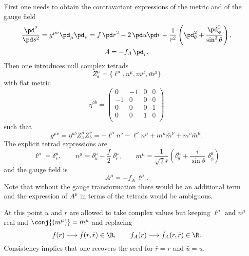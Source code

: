 First one needs to obtain the contravariant expressions of the metric and of the gauge field
\begin{subequations}
\begin{gather}
	\frac{\pd^2}{\pd s^2} = g^{\mu\nu} \pd_\mu \pd_\nu
		= f\, \pd r^2 - 2\, \pd u \pd r + \frac{1}{r^2} \left( \pd_\theta^2 + \frac{\pd_\phi^2}{\sin^2 \theta} \right), \\
	A = - f_A\, \pd_r.
\end{gather}
\end{subequations}
Then one introduces null complex tetrads
\begin{equation}
	Z_a^\mu = \{ \ell^\mu, n^\mu, m^\mu, \bar m^\mu \}
\end{equation} 
with flat metric
\begin{equation}
	\eta^{ab} =
		\begin{pmatrix}
			0 & -1 & 0 & 0 \\
			-1 & 0 & 0 & 0 \\
			0 &  0 & 0 & 1 \\
			0 &  0 & 1 & 0 \\
		\end{pmatrix}
\end{equation} 
such that
\begin{equation}
	g^{\mu\nu} = \eta^{ab} Z^\mu_a Z^\nu_b
		= - \ell^\mu n^\nu - \ell^\nu n^\mu + m^\mu \bar m^\nu + m^\nu \bar m^\mu.
\end{equation} 
The explicit tetrad expressions are
\begin{equation}
	\label{algo:eq:static:tetrads}
	\ell^\mu = \delta_r^\mu, \qquad
	n^\mu = \delta_u^\mu -\frac{f}{2}\; \delta_r^\mu, \qquad
	m^\mu = \frac{1}{\sqrt{2} \bar r} \left(\delta_\theta^\mu + \frac{i}{\sin \theta}\; \delta_\phi^\mu \right)
\end{equation}
and the gauge field is
\begin{equation}
	A^\mu = -f_A\, \ell^\mu.
\end{equation} 
Note that without the gauge transformation there would be an additional term and the expression of $A^\mu$ in terms of the tetrads would be ambiguous.

At this point $u$ and $r$ are allowed to take complex values but keeping $\ell^\mu$ and $n^\mu$ real and $\conj{(m^\mu)} = \bar m^\mu$ and replacing
\begin{equation}
	f(r) \longrightarrow \tilde f(r, \bar r) \in \R, \qquad
	f_A(r) \longrightarrow \tilde f_A(r, \bar r) \in \R.
\end{equation} 
Consistency implies that one recovers the seed for $\bar r = r$ and $\bar u = u$.

